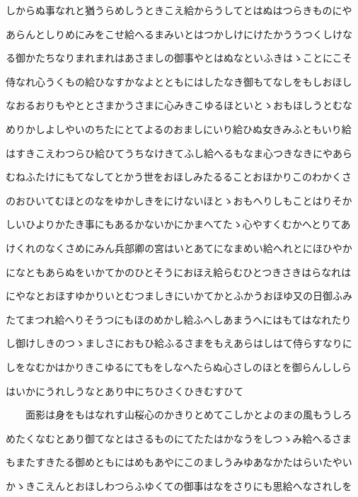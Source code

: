\documentclass[a4paper,11pt,landscape]{ltjtarticle}
\begin{document}
\par\medskip
しからぬ事なれと猶うらめしうときこえ給からうしてとはぬはつらきものにや
\par\medskip
あらんとしりめにみをこせ給へるまみいとはつかしけにけたかううつくしけな
\par\medskip
る御かたちなりまれまれはあさましの御事やとはぬなといふきはゝことにこそ
\par\medskip
侍なれ心うくもの給ひなすかなよとともにはしたなき御もてなしをもしおほし
\par\medskip
なおるおりもやととさまかうさまに心みきこゆるほといとゝおもほしうとむな
\par\medskip
めりかしよしやいのちたにとてよるのおましにいり給ひぬ女きみふともいり給
\par\medskip
はすきこえわつらひ給ひてうちなけきてふし給へるもなま心つきなきにやあら
\par\medskip
むねふたけにもてなしてとかう世をおほしみたるることおほかりこのわかくさ
\par\medskip
のおひいてむほとのなをゆかしきをにけないほとゝおもへりしもことはりそか
\par\medskip
しいひよりかたき事にもあるかないかにかまへてたゝ心やすくむかへとりてあ
\par\medskip
けくれのなくさめにみん兵部卿の宮はいとあてになまめい給へれとにほひやか
\par\medskip
になともあらぬをいかてかのひとそうにおほえ給らむひとつきさきはらなれは
\par\medskip
にやなとおほすゆかりいとむつましきにいかてかとふかうおほゆ又の日御ふみ
\par\medskip
たてまつれ給へりそうつにもほのめかし給ふへしあまうへにはもてはなれたり
\par\medskip
し御けしきのつゝましさにおもひ給ふるさまをもえあらはしはて侍らすなりに
\par\medskip
しをなむかはかりきこゆるにてもをしなへたらぬ心さしのほとを御らんししら
\par\medskip
はいかにうれしうなとあり中にちひさくひきむすひて
\par\medskip
　　面影は身をもはなれす山桜心のかきりとめてこしかとよのまの風もうしろ
\par\medskip
めたくなむとあり御てなとはさるものにてたたはかなうをしつゝみ給へるさま
\par\medskip
もまたすきたる御めともにはめもあやにこのましうみゆあなかたはらいたやい
\par\medskip
かゝきこえんとおほしわつらふゆくての御事はなをさりにも思給へなされしを
\par\medskip
\end{document}
